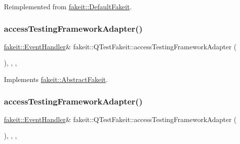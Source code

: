 Reimplemented from \mbox{\hyperlink{classfakeit_1_1DefaultFakeit_a02cb8f08a94e7bf830c87f74f20c9bd9}{fakeit\+::\+Default\+Fakeit}}.

\mbox{\label{classfakeit_1_1QTestFakeit_aee8ba80a302f34245af89d82e6a69b24}} 
\subsubsection{\texorpdfstring{accessTestingFrameworkAdapter()}{accessTestingFrameworkAdapter()}\hspace{0.1cm}{\footnotesize\ttfamily [1/2]}}
{\footnotesize\ttfamily \mbox{\hyperlink{structfakeit_1_1EventHandler}{fakeit\+::\+Event\+Handler}}\& fakeit\+::\+Q\+Test\+Fakeit\+::access\+Testing\+Framework\+Adapter (\begin{DoxyParamCaption}{ }\end{DoxyParamCaption})\hspace{0.3cm}{\ttfamily [inline]}, {\ttfamily [override]}, {\ttfamily [protected]}, {\ttfamily [virtual]}}



Implements \mbox{\hyperlink{classfakeit_1_1AbstractFakeit_a9476180a503524d49d1978fbbc125b01}{fakeit\+::\+Abstract\+Fakeit}}.

\mbox{\label{classfakeit_1_1QTestFakeit_aee8ba80a302f34245af89d82e6a69b24}} 
\subsubsection{\texorpdfstring{accessTestingFrameworkAdapter()}{accessTestingFrameworkAdapter()}\hspace{0.1cm}{\footnotesize\ttfamily [2/2]}}
{\footnotesize\ttfamily \mbox{\hyperlink{structfakeit_1_1EventHandler}{fakeit\+::\+Event\+Handler}}\& fakeit\+::\+Q\+Test\+Fakeit\+::access\+Testing\+Framework\+Adapter (\begin{DoxyParamCaption}{ }\end{DoxyParamCaption})\hspace{0.3cm}{\ttfamily [inline]}, {\ttfamily [override]}, {\ttfamily [protected]}, {\ttfamily [virtual]}}




